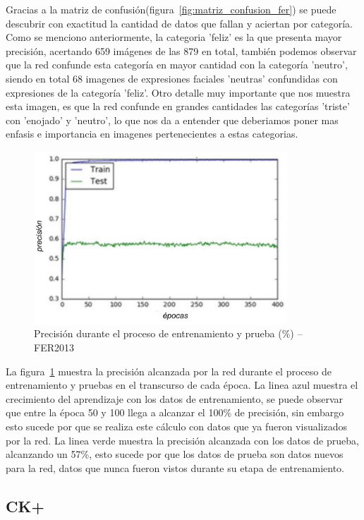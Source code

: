 Gracias a la matriz de confusión(figura~\ref{fig:matriz_confusion_fer}) se puede descubrir con exactitud la cantidad de datos que fallan y aciertan por categoría. Como se menciono anteriormente, la categoria 'feliz' es la que presenta mayor precisión, acertando 659 imágenes de las 879 en total, también podemos observar que la red confunde esta categoría en mayor cantidad con la categoría 'neutro', siendo en total 68 imagenes de expresiones faciales 'neutras' confundidas con expresiones de la categoría 'feliz'. Otro detalle muy importante que nos muestra esta imagen, es que la red confunde en grandes cantidades las categorías 'triste' con 'enojado' y 'neutro', lo que nos da a entender que deberiamos poner mas enfasis e importancia en imagenes pertenecientes a estas categorias.  
\begin{figure}[H]
		\centering
		\includegraphics[width=95mm]{Imagenes/precision_fer.pdf}
		\caption{Precisión durante el proceso de entrenamiento y prueba (\%) – FER2013}
		\label{fig:precision_fer}
\end{figure}

La figura~\ref{fig:precision_fer} muestra la precisión alcanzada por la red durante el proceso de entrenamiento y pruebas en el transcurso de cada época. La linea azul muestra el crecimiento del aprendizaje con los datos de entrenamiento, se puede observar que entre la época 50 y 100 llega a alcanzar el 100\% de precisión, sin embargo esto sucede por que se realiza este cálculo con datos que ya fueron visualizados por la red. La linea verde muestra la precisión alcanzada con los datos de prueba, alcanzando un 57\%, esto sucede por que los datos de prueba son datos nuevos para la red, datos que nunca fueron vistos durante su etapa de entrenamiento.

 
\subsection{CK+}


